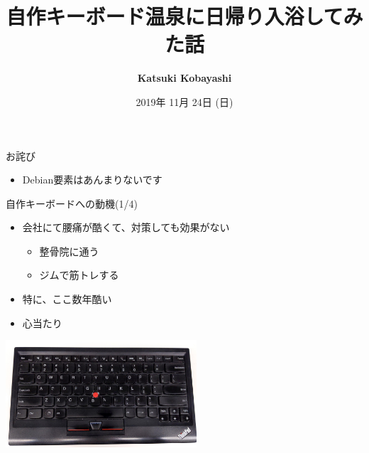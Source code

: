 \documentclass[cjk,dvipdfmx,10pt,compress,fragile%
hyperref={bookmarks=true,bookmarksnumbered=true,bookmarksopen=false,%
colorlinks=false,%
pdftitle={第 134 回 関西 Debian 勉強会},%
pdfauthor={小林},%
pdfsubject={資料},%
}]{beamer}
\title{自作キーボード温泉に日帰り入浴してみた話}
\author[Katsuki Kobayashi]{{\large\bf Katsuki Kobayashi}}
\institute[Debian JP]{{\normalsize\tt 関西 Debian 勉強会}}
\date{{\small 2019年 11月 24日 (日)}}
\begin{document}
\begin{frame}[fragile]
\titlepage
\end{frame}

\begin{frame}[fragile,t]{お詫び}
 \begin{itemize}
  \item Debian要素はあんまりないです
 \end{itemize}
\end{frame}


\begin{frame}[fragile,t]{自作キーボードへの動機(1/4)}
 \begin{itemize}
  \item 会社にて腰痛が酷くて、対策しても効果がない
	\begin{itemize}
	 \item 整骨院に通う
	 \item ジムで筋トレする
	\end{itemize}
  \item 特に、ここ数年酷い
	\pause
  \item 心当たり
 \end{itemize}
\begin{center}
 \includegraphics[keepaspectratio,height=4cm]{./img/thinkpad_kb.jpg}
\end{center}
\end{frame}
\end{document}
